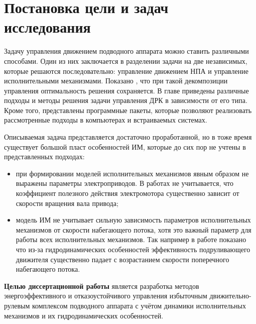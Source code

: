 
\section{Постановка цели и задач исследования}\label{sec:Statement/SetProblems}

Задачу управления движением подводного аппарата можно ставить различными способами.
Один из них заключается в разделении задачи на две независимых, которые решаются последовательно: управление движением НПА и управление исполнительными механизмами.
Показано \cite{10.1016/j.automatica.2004.09.007}, что при такой декомпозиции управления оптимальность решения сохраняется.
В главе приведены различные подходы и методы решения задачи управления ДРК в зависимости от его типа.
Кроме того, представлены программные пакеты, которые позволяют реализовать рассмотренные подходы в компьютерах и встраиваемых системах. 

Описываемая задача представляется достаточно проработанной, но в тоже время существует большой пласт особенностей ИМ, которые до сих пор не учтены в представленных подходах:
\begin{itemize}
    \item при формировании моделей исполнительных механизмов явным образом не выражены параметры электроприводов. В работах не учитывается, что коэффициент полезного действия электромотора существенно зависит от скорости вращения вала привода;
    \item модель ИМ не учитывает сильную зависимость параметров исполнительных механизмов от скорости набегающего потока, хотя это важный параметр для работы всех исполнительных механизмов. Так например в работе \cite{palmer2008modelling} показано что из-за гидродинамических особенностей эффективность подруливающего движителя существенно падает с возрастанием скорости поперечного набегающего потока.
\end{itemize}

\textbf{Целью диссертационной работы} является разработка методов энергоэффективного и отказоустойчивого управления избыточным движительно-рулевым комплексом подводного аппарата с учётом динамики исполнительных механизмов и их гидродинамических особенностей.

